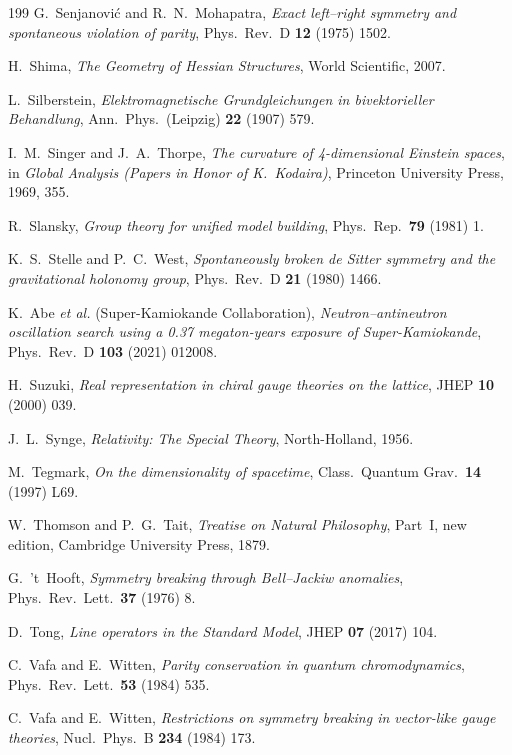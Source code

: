 \begin{thebibliography}{199}
 G.~Senjanovi\'c and R.~N.~Mohapatra, \emph{Exact left--right symmetry and spontaneous violation of parity}, Phys.~Rev.~D \textbf{12} (1975) 1502.

 H.~Shima, \emph{The Geometry of Hessian Structures}, World Scientific, 2007.

 L.~Silberstein, \emph{Elektromagnetische Grundgleichungen in bivektorieller Behandlung}, Ann.~Phys.~(Leipzig) \textbf{22} (1907) 579.

 I.~M.~Singer and J.~A.~Thorpe, \emph{The curvature of 4-dimensional Einstein spaces}, in \emph{Global Analysis (Papers in Honor of K.~Kodaira)},
Princeton University Press, 1969, 355.

 R.~Slansky, \emph{Group theory for unified model building}, Phys.~Rep.~\textbf{79} (1981) 1.

 K.~S.~Stelle and P.~C.~West, \emph{Spontaneously broken de Sitter symmetry and the gravitational holonomy group}, Phys.~Rev.~D \textbf{21} (1980) 1466.

 K.~Abe \emph{et al.} (Super-Kamiokande Collaboration), \emph{Neutron--antineutron oscillation search using a 0.37 megaton-years exposure of
Super-Kamiokande}, Phys.~Rev.~D \textbf{103} (2021) 012008.

 H.~Suzuki, \emph{Real representation in chiral gauge theories on the lattice}, JHEP \textbf{10} (2000) 039.

 J.~L.~Synge, \emph{Relativity: The Special Theory}, North-Holland, 1956.

 M.~Tegmark, \emph{On the dimensionality of spacetime}, Class.~Quantum Grav.~\textbf{14} (1997) L69.

 W.~Thomson and P.~G.~Tait, \emph{Treatise on Natural Philosophy}, Part~I, new edition, Cambridge University Press, 1879.

 G.~'t~Hooft, \emph{Symmetry breaking through Bell--Jackiw anomalies}, Phys.~Rev.~Lett.~\textbf{37} (1976) 8.

 D.~Tong, \emph{Line operators in the Standard Model}, JHEP \textbf{07} (2017) 104.

 C.~Vafa and E.~Witten, \emph{Parity conservation in quantum chromodynamics}, Phys.~Rev.~Lett.~\textbf{53} (1984) 535.

 C.~Vafa and E.~Witten, \emph{Restrictions on symmetry breaking in vector-like gauge theories}, Nucl.~Phys.~B \textbf{234} (1984) 173.


\end{thebibliography}
